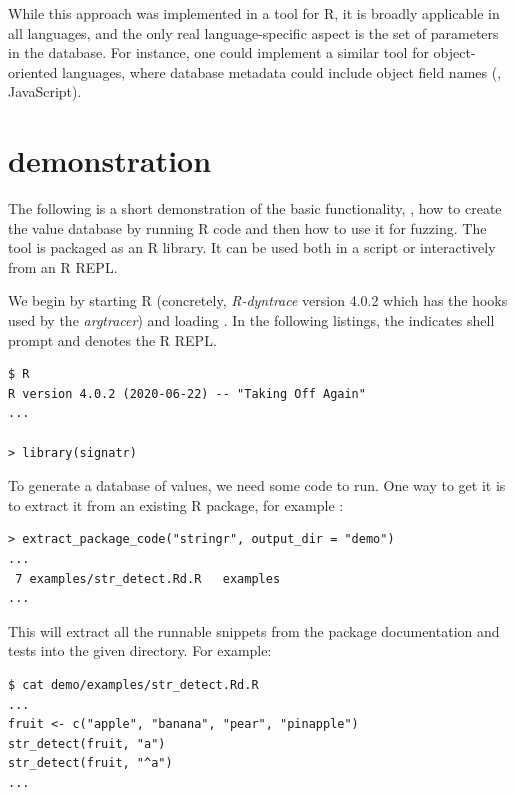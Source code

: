 \documentclass[sigplan,nonacm,anonymous,review]{acmart}
\begin{document}
While this approach was implemented in a tool for R, it is broadly applicable in all languages, and the only real language-specific aspect is the set of parameters in the database.
For instance, one could implement a similar tool for object-oriented languages, where database metadata could include object field names (\Eg, JavaScript).




\appendix

\section{\tool demonstration}\label{sec:demo}

\lstset{
    basicstyle=\scriptsize\ttfamily,
    numbers=none,
}

The following is a short demonstration of the basic \tool functionality, \Ie, how to create the value database by running R code and then how to use it for fuzzing.
The tool is packaged as an R library.
It can be used both in a script or interactively from an R REPL.

We begin by starting R (concretely, \emph{R-dyntrace} version 4.0.2 which has the hooks used by the \emph{argtracer}) and loading \tool.
In the following listings, the \code{\$} indicates shell prompt and \code{>} denotes the R REPL.

\begin{lstlisting}
$ R
R version 4.0.2 (2020-06-22) -- "Taking Off Again"
...

> library(signatr)
\end{lstlisting}

To generate a database of values, we need some code to run.
One way to get it is to extract it from an existing R package, for example :

\begin{lstlisting}
> extract_package_code("stringr", output_dir = "demo")
...
 7 examples/str_detect.Rd.R   examples
...
\end{lstlisting}

This will extract all the runnable snippets from the package documentation and tests into the given directory.
For example:

\begin{lstlisting}
$ cat demo/examples/str_detect.Rd.R
...
fruit <- c("apple", "banana", "pear", "pinapple")
str_detect(fruit, "a")
str_detect(fruit, "^a")
...
\end{lstlisting}
\end{document}

